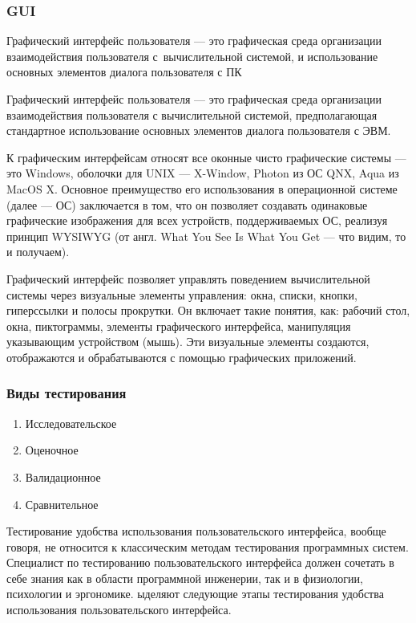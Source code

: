 \documentclass{../industrial-development}
\begin{document}
\begin{frame} \frametitle{GUI}
 \alert{Графический интерфейс пользователя} — это графическая среда организации взаимодействия пользователя с~вычислительной системой, и использование основных элементов диалога пользователя с ПК
\end{frame}

\lecturenotes

Графический интерфейс пользователя — это графическая среда организации взаимодействия пользователя с вычислительной системой, предполагающая стандартное использование основных элементов диалога пользователя с ЭВМ.

К графическим интерфейсам относят все оконные чисто графические системы — это Windows, оболочки для UNIX — X-Window, Photon из ОС QNX, Aqua из MacOS X. Основное преимущество его использования в операционной системе (далее — ОС) заключается в том, что он позволяет создавать одинаковые графические изображения для всех устройств, поддерживаемых ОС, реализуя принцип WYSIWYG (от англ. What You See Is What You Get — что видим, то и получаем).

Графический интерфейс позволяет управлять поведением вычислительной системы через визуальные элементы управления: окна, списки, кнопки, гиперссылки и полосы прокрутки. Он включает такие понятия, как: рабочий стол, окна, пиктограммы, элементы графического интерфейса, манипуляция указывающим устройством (мышь). Эти визуальные элементы создаются, отображаются и обрабатываются с помощью графических приложений.

\begin{frame} \frametitle{Виды тестирования}
  \begin{enumerate}
  \item Исследовательское
  \item Оценочное
  \item Валидационное
  \item Сравнительное
  \end{enumerate}
\end{frame}

\lecturenotes

Тестирование удобства использования пользовательского интерфейса, вообще говоря, не относится к классическим методам тестирования программных систем. Специалист по тестированию пользовательского интерфейса должен сочетать в себе знания как в области программной инженерии, так и в физиологии, психологии и эргономике.
ыделяют следующие этапы тестирования удобства использования пользовательского интерфейса.
\end{document}
